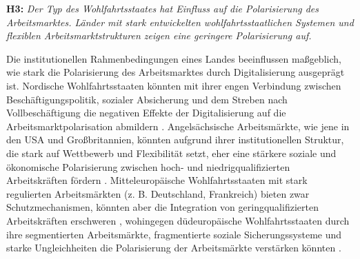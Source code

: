 \textbf{H3:} \textit{Der Typ des Wohlfahrtsstaates hat Einfluss auf die Polarisierung des 
Arbeitsmarktes. Länder mit stark entwickelten wohlfahrtsstaatlichen Systemen und flexiblen 
Arbeitsmarktstrukturen zeigen eine geringere Polarisierung auf.}

Die institutionellen Rahmenbedingungen eines Landes beeinflussen maßgeblich, wie stark die 
Polarisierung des Arbeitsmarktes durch Digitalisierung ausgeprägt ist. Nordische 
Wohlfahrtsstaaten könnten mit ihrer engen Verbindung zwischen Beschäftigungspolitik, sozialer 
Absicherung und dem Streben nach Vollbeschäftigung die negativen Effekte der Digitalisierung auf 
die Arbeitsmarktpolarisation abmildern \parencite[vgl.][S. 28–29]{espingandersen1990thethree}.
Angelsächsische Arbeitsmärkte, wie jene in den USA und Großbritannien, könnten aufgrund ihrer 
institutionellen Struktur, die stark auf Wettbewerb und Flexibilität setzt, eher eine stärkere 
soziale und ökonomische Polarisierung zwischen hoch- und niedrigqualifizierten Arbeitskräften 
fördern \parencite[vgl.][S. 21–22]{hall2001varieties}. Mitteleuropäische Wohlfahrtsstaaten mit 
stark regulierten Arbeitsmärkten (z. B. Deutschland, Frankreich) bieten zwar Schutzmechanismen, 
könnten aber die Integration von geringqualifizierten Arbeitskräften erschweren 
\parencite[vgl.][S. 25–26]{hall2001varieties}, wohingegen düdeuropäische Wohlfahrtsstaaten durch 
ihre segmentierten Arbeitsmärkte, fragmentierte soziale Sicherungssysteme und starke 
Ungleichheiten die Polarisierung der Arbeitsmärkte verstärken könnten 
\parencite[vgl.][S. 17–19]{ferrera1996thesouthern}.

